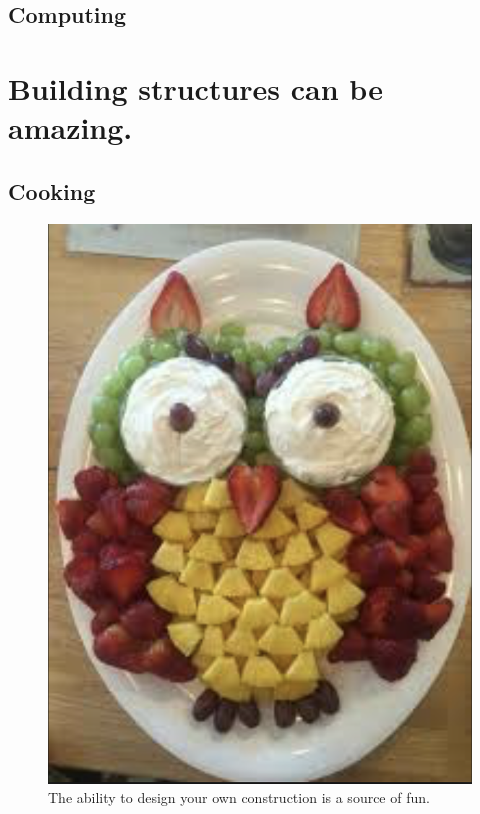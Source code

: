 \documentclass[]{report}
\begin{document}
\section{Computing}
 



\chapter{Building structures can be amazing.}
\section{Cooking}

\begin{figure}
	\centering
	\includegraphics[width=0.7\linewidth]{userDefinedDataStructures}
	\caption{The ability to design your own construction is a source of fun.}
	\label{fig:userdefineddatastructures}
\end{figure}
\end{document}
